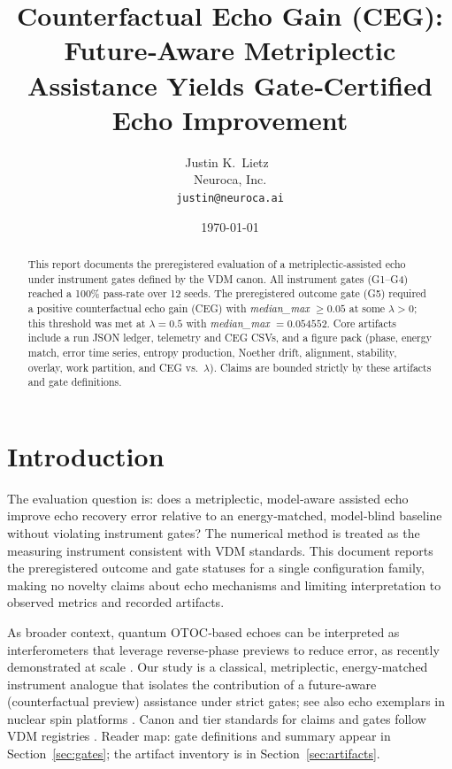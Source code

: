 \documentclass{article}
\title{Counterfactual Echo Gain (CEG): Future‑Aware Metriplectic Assistance Yields Gate‑Certified Echo Improvement}
\author{Justin K.\ Lietz~\orcidicon{0009-0008-9028-1366}\\
Neuroca, Inc.\\
\texttt{justin@neuroca.ai}}
\date{\today}
\begin{document}
\maketitle

\begin{abstract}
This report documents the preregistered evaluation of a metriplectic-assisted echo under instrument gates defined by the VDM canon. All instrument gates (G1–G4) reached a 100\% pass-rate over 12 seeds. The preregistered outcome gate (G5) required a positive counterfactual echo gain (CEG) with \emph{median\_max} $\geq 0.05$ at some $\lambda>0$; this threshold was met at $\lambda=0.5$ with \emph{median\_max} $=0.054552$. Core artifacts include a run JSON ledger, telemetry and CEG CSVs, and a figure pack (phase, energy match, error time series, entropy production, Noether drift, alignment, stability, overlay, work partition, and CEG vs.\ $\lambda$). Claims are bounded strictly by these artifacts and gate definitions.
\end{abstract}


\section{Introduction}
The evaluation question is: does a metriplectic, model‑aware assisted echo improve echo recovery error relative to an energy‑matched, model‑blind baseline without violating instrument gates? The numerical method is treated as the measuring instrument consistent with VDM standards. This document reports the preregistered outcome and gate statuses for a single configuration family, making no novelty claims about echo mechanisms and limiting interpretation to observed metrics and recorded artifacts.

As broader context, quantum OTOC‑based echoes can be interpreted as interferometers that leverage reverse‑phase previews to reduce error, as recently demonstrated at scale \citep{GoogleQAIEdgeErgodicity2025,GoogleQAIESM2025}. Our study is a classical, metriplectic, energy‑matched instrument analogue that isolates the contribution of a future‑aware (counterfactual preview) assistance under strict gates; see also echo exemplars in nuclear spin platforms \citep{LiZhang2025SpinEchoGeometry}. Canon and tier standards for claims and gates follow VDM registries \citep{VDMCanonAxioms2025,VDMCanonEquations2025,VDMCanonTierStandards2025}. Reader map: gate definitions and summary appear in Section~\ref{sec:gates}; the artifact inventory is in Section~\ref{sec:artifacts}.
\end{document}
